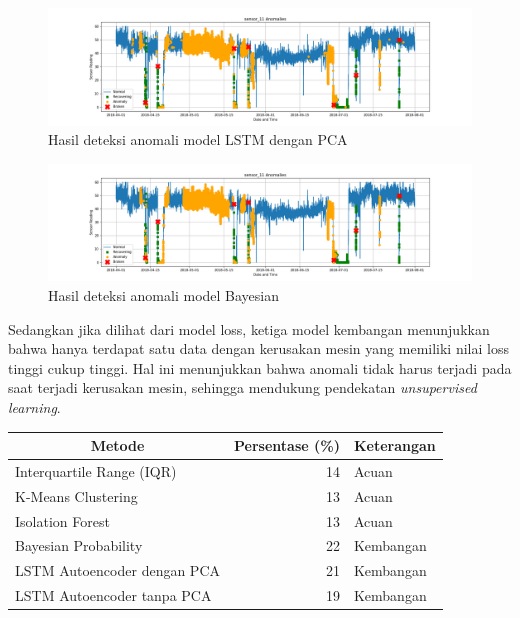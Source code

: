     \begin{figure}[h]
        \centerline{\includegraphics[width=1.4\textwidth]{resources/LSTM/LSTM_PCA_sensor_11.png}}
        \caption{Hasil deteksi anomali model LSTM dengan PCA}
    \end{figure}
    
    \begin{figure}[h]
        \centerline{\includegraphics[width=1.4\textwidth]{resources/Bayes/Bayes_sensor_11.png}}
        \caption{Hasil deteksi anomali model Bayesian}
    \end{figure}

    Sedangkan jika dilihat dari model loss, ketiga model kembangan menunjukkan bahwa hanya terdapat satu data dengan kerusakan mesin yang memiliki nilai loss tinggi cukup tinggi. Hal ini menunjukkan bahwa anomali tidak harus terjadi pada saat terjadi kerusakan mesin, sehingga mendukung pendekatan \textit{unsupervised learning}.

    \begin{table}[H]
        \centering
        \begin{tabular}{|l|r|l|}
            \hline
            \multicolumn{1}{|c|}{\textbf{Metode}} & \multicolumn{1}{c|}{\textbf{Persentase (\%)}} & \multicolumn{1}{c|}{\textbf{Keterangan}} \\ \hline
            Interquartile Range (IQR)   & 14 & Acuan     \\ \hline
            K-Means Clustering          & 13 & Acuan     \\ \hline
            Isolation Forest            & 13 & Acuan     \\ \hline
            Bayesian Probability        & 22 & Kembangan \\ \hline
            LSTM Autoencoder dengan PCA & 21 & Kembangan \\ \hline
            LSTM Autoencoder tanpa PCA  & 19 & Kembangan \\ \hline
        \end{tabular}
    \end{table}

